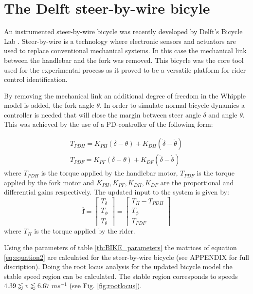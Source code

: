 \section{The Delft steer-by-wire bicyle}

An instrumented steer-by-wire bicycle was recently developed by Delft's Bicycle Lab \cite{dialynas2019wire}. Steer-by-wire is a technology where electronic sensors and actuators are used to replace conventional mechanical systems. In this case the mechanical link between the handlebar and the fork was removed. This bicycle was the core tool used for the experimental process as it proved to be a versatile platform for rider control identification.


By removing the mechanical link an additional degree of freedom in the Whipple model  is added, the fork angle \ensuremath{\theta}. In order to simulate normal bicycle dynamics a controller is needed that will close the margin between steer angle \ensuremath{\delta} and angle \ensuremath{\theta}. This was achieved by the use of a PD-controller of the following form:


\begin{equation}
\begin{array}{l}{T_{P D H}=K_{P H}(\delta-\theta)+K_{D H}(\dot{\delta}-\dot{\theta})} \\ {T_{P D F}=K_{P F}(\delta-\theta)+K_{D F}(\dot{\delta}-\dot{\theta})}\end{array}
\end{equation}
where \ensuremath{T_{P D H}} is the torque applied by the  handlebar motor,  \ensuremath{T_{P D F}} is the torque applied by the fork motor and \ensuremath{K_{P H},K_{P F},K_{D H},K_{D F}} are the proportional and differential gains respectively. The updated input to the system is given by:
\begin{equation}
\overline{\boldsymbol{f}}=\left[ \begin{array}{c}{T_{\delta}} \\ {T_{\phi}} \\ {T_{\theta}}\end{array}\right]=\left[ \begin{array}{c}{T_{H}-T_{P D H}} \\ {T_{\phi}}  \\ {T_{P D F}}\end{array}\right]
\end{equation}
where \ensuremath{T_{H}} is the torque applied by the rider.

Using the parameters of table  \ref{tb:BIKE_parameters} the matrices of equation \ref{eq:equation2} are calculated for the steer-by-wire bicycle (see APPENDIX for full discription). Doing the root locus analysis for the updated bicycle model the stable speed region can be calculated. The stable region corresponds to speeds  \ensuremath{4.39\lessapprox v \lessapprox 6.67\; ms^{-1}} (see Fig. \ref{fig:rootlocus}).

